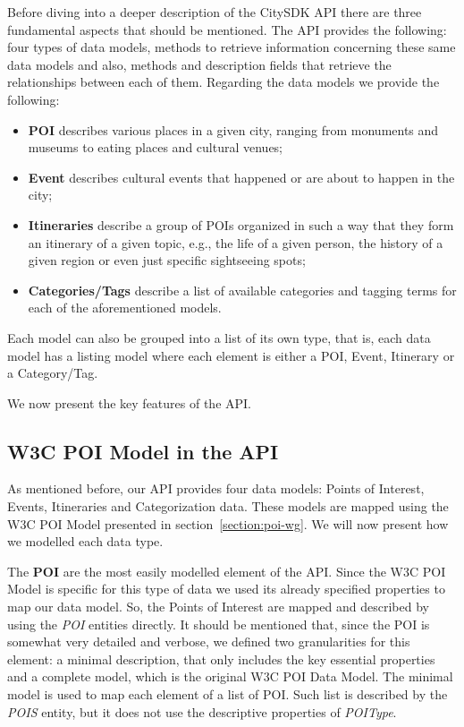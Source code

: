\documentclass[times]{ettauth}
\begin{document}
Before diving into a deeper description of the CitySDK API there are three fundamental aspects that should be mentioned. The API provides the following: four types of data models, methods to retrieve information concerning these same data models and also, methods and description fields that retrieve the relationships between each of them. Regarding the data models we provide the following:
\begin{itemize}
\item \textbf{\ac{POI}} describes various places in a given city, ranging from monuments and museums to eating places and cultural venues; 
\item \textbf{Event} describes cultural events that happened or are about to happen in the city;
\item \textbf{Itineraries} describe a group of \acp{POI} organized in such a way that they form an itinerary of a given topic, e.g., the life of a given person, the history of a given region or even just specific sightseeing spots;
\item \textbf{Categories/Tags} describe a list of available categories and tagging terms for each of the aforementioned models.
\end{itemize}

Each model can also be grouped into a list of its own type, that is, each data model has a listing model where each element is either a \ac{POI}, Event, Itinerary or a Category/Tag.

We now present the key features of the API.

\subsection{W3C POI Model in the API}
\label{section:w3cpoi}
As mentioned before, our API provides four data models: Points of Interest, Events, Itineraries and Categorization data. These models are mapped using the W3C POI Model presented in section~\ref{section:poi-wg}. We will now present how we modelled each data type.

The \textbf{\acf{POI}} are the most easily modelled element of the API. Since the W3C POI Model is specific for this type of data we used its already specified properties to map our data model. So, the Points of Interest are mapped and described by using the \textit{POI} entities directly. It should be mentioned that, since the \ac{POI} is somewhat very detailed and verbose, we defined two granularities for this element: a minimal description, that only includes the key essential properties and a complete model, which is the original W3C POI Data Model. The minimal model is used to map each element of a list of \ac{POI}. Such list is described by the \textit{POIS} entity, but it does not use the descriptive properties of \textit{POIType}.
\end{document}
